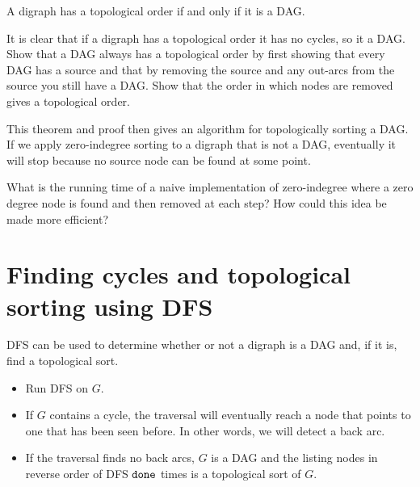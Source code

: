 \begin{Theorem} \label{thm:topDAG}
A digraph has a topological order if and only if it is a DAG.
\end{Theorem}

\begin{Boxample}[8]
It is clear that if a digraph has a topological order it has no cycles, so it a DAG. 
Show that a DAG always has a topological order by first showing that every DAG has a source
and that by removing the source and any out-arcs from the source you still have a DAG. 
Show that the order in which nodes are removed gives a topological order.
\end{Boxample}

This theorem and proof then gives an algorithm 
for topologically sorting a DAG. 
If we apply zero-indegree sorting to a digraph that is not a DAG, 
eventually it will stop because no source node can be found at some point.

\begin{Boxample}[3]
What is the running time of a naive implementation of zero-indegree where a zero degree node is found and then removed at each step? How could this idea be made more efficient?
\end{Boxample}

\section{Finding cycles and topological sorting using DFS}
DFS can be used to determine whether or not a digraph is a DAG and, if it is, find a topological sort.
\begin{itemize}
  \item Run DFS on $G$.
  \item If $G$ contains a cycle, the traversal will eventually reach a node that points to one that has been seen before. 
  In other words, we will detect a back arc. 
  \item If the traversal finds no back arcs, $G$ is a DAG 
  and the listing nodes in reverse order of DFS $\operatorname{\text{\texttt{done}}}$ times is a topological sort of $G$.
\end{itemize}

